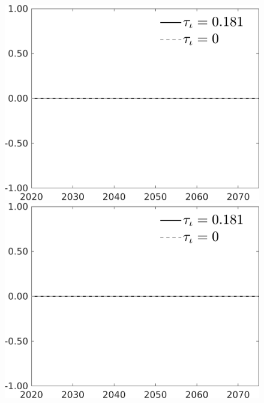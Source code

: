\documentclass[12pt]{article}
\begin{document}
\begin{figure}[h!!]
\begin{minipage}[]{0.32\textwidth}
\end{minipage}	
	\begin{minipage}[]{0.32\textwidth}
\includegraphics[width=1\textwidth]{../../codding_model/own_basedOnFried/optimalPol_010922_revision/figures/all_13Sept22/PerdifNoTauf_Equlab_regime0_CompTaul_sn_spillover0_nsk0_xgr1_knspil1_sep1_LFlimit0_emsbase0_countec0_GovRev0_etaa0.79_lgd1.png}
\end{minipage}	\begin{minipage}[]{0.32\textwidth}
\includegraphics[width=1\textwidth]{../../codding_model/own_basedOnFried/optimalPol_010922_revision/figures/all_13Sept22/PerdifNoTauf_Equlab_regime0_CompTaul_sff_spillover0_nsk0_xgr1_knspil1_sep1_LFlimit0_emsbase0_countec0_GovRev0_etaa0.79_lgd1.png}

\end{minipage}
\end{figure}
\end{document}
